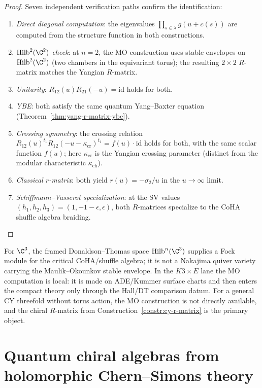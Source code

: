 \begin{proof}
Seven independent verification paths confirm the identification:
\begin{enumerate}
 \item \emph{Direct diagonal computation}: the eigenvalues $\prod_{s \in \lambda} g(u + c(s))$ are computed from the structure function in both constructions.
 \item \emph{$\mathrm{Hilb}^2(\C^2)$ check}: at $n = 2$, the MO construction uses stable envelopes on $\mathrm{Hilb}^2(\C^2)$ (two chambers in the equivariant torus); the resulting $2 \times 2$ $R$-matrix matches the Yangian $R$-matrix.
 \item \emph{Unitarity}: $R_{12}(u) R_{21}(-u) = \mathrm{id}$ holds for both.
 \item \emph{YBE}: both satisfy the same quantum Yang--Baxter equation (Theorem~\ref{thm:yang-r-matrix-ybe}).
 \item \emph{Crossing symmetry}: the crossing relation $R_{12}(u)^{t_1} R_{12}(-u - \kappa_{\mathrm{cr}})^{t_1} = f(u) \cdot \mathrm{id}$ holds for both, with the same scalar function $f(u)$; here $\kappa_{\mathrm{cr}}$ is the Yangian crossing parameter (distinct from the modular characteristic $\kappa_{\mathrm{ch}}$).
 \item \emph{Classical $r$-matrix}: both yield $r(u) = -\sigma_2 / u$ in the $u \to \infty$ limit.
 \item \emph{Schiffmann--Vasserot specialization}: at the SV values $(h_1, h_2, h_3) = (1, -1-\epsilon, \epsilon)$, both $R$-matrices specialize to the CoHA shuffle algebra braiding.
\end{enumerate}
\end{proof}

\begin{remark}
\label{rem:mo-comparison-scope}
For \(\C^3\), the framed Donaldson--Thomas space
\(\mathrm{Hilb}^n(\C^3)\) supplies a Fock module for the critical
CoHA/shuffle algebra; it is not a Nakajima quiver variety carrying the
Maulik--Okounkov stable envelope.  In the \(K3\times E\) lane the MO
computation is local: it is made on ADE/Kummer surface charts and then
enters the compact theory only through the Hall/DT comparison datum.
For a general CY threefold without torus action, the MO construction is
not directly available, and the chiral \(R\)-matrix from
Construction~\ref{constr:cy-r-matrix} is the primary object.
\end{remark}

\section{Quantum chiral algebras from holomorphic Chern--Simons theory}
\label{sec:qca-from-qg}

